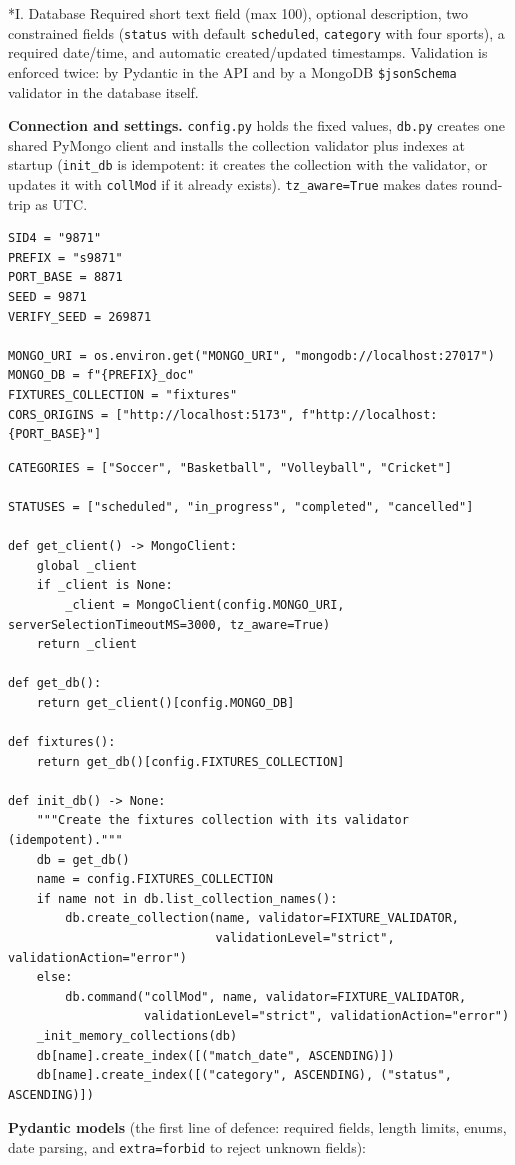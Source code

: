 \documentclass[11pt]{article}
\makeatletter
\renewcommand\subsection{\@startsection{subsection}{2}{\z@}{-2.2ex \@plus -1ex \@minus -.2ex}{0.8ex \@plus.2ex}{\normalfont\fontsize{12}{14.5}\selectfont\bfseries}}
\makeatother
\begin{document}
\subsection*{I. Database}
Required short text field (max 100), optional description, two constrained fields (\verb|status| with default \verb|scheduled|, \verb|category| with four sports), a required date/time, and automatic created/updated timestamps. Validation is enforced twice: by Pydantic in the API and by a MongoDB \verb|$jsonSchema| validator in the database itself.

\textbf{Connection and settings.} \verb|config.py| holds the fixed values, \verb|db.py| creates one shared PyMongo client and installs the collection validator plus indexes at startup (\verb|init_db| is idempotent: it creates the collection with the validator, or updates it with \verb|collMod| if it already exists). \verb|tz_aware=True| makes dates round-trip as UTC.

\begingroup\lstset{basicstyle=\ttfamily\scriptsize}
\begin{lstlisting}
SID4 = "9871"
PREFIX = "s9871"
PORT_BASE = 8871
SEED = 9871
VERIFY_SEED = 269871

MONGO_URI = os.environ.get("MONGO_URI", "mongodb://localhost:27017")
MONGO_DB = f"{PREFIX}_doc"
FIXTURES_COLLECTION = "fixtures"
CORS_ORIGINS = ["http://localhost:5173", f"http://localhost:{PORT_BASE}"]
\end{lstlisting}
\endgroup
\begingroup\lstset{basicstyle=\ttfamily\scriptsize}
\begin{lstlisting}
CATEGORIES = ["Soccer", "Basketball", "Volleyball", "Cricket"]

STATUSES = ["scheduled", "in_progress", "completed", "cancelled"]

def get_client() -> MongoClient:
    global _client
    if _client is None:
        _client = MongoClient(config.MONGO_URI, serverSelectionTimeoutMS=3000, tz_aware=True)
    return _client

def get_db():
    return get_client()[config.MONGO_DB]

def fixtures():
    return get_db()[config.FIXTURES_COLLECTION]

def init_db() -> None:
    """Create the fixtures collection with its validator (idempotent)."""
    db = get_db()
    name = config.FIXTURES_COLLECTION
    if name not in db.list_collection_names():
        db.create_collection(name, validator=FIXTURE_VALIDATOR,
                             validationLevel="strict", validationAction="error")
    else:
        db.command("collMod", name, validator=FIXTURE_VALIDATOR,
                   validationLevel="strict", validationAction="error")
    _init_memory_collections(db)
    db[name].create_index([("match_date", ASCENDING)])
    db[name].create_index([("category", ASCENDING), ("status", ASCENDING)])
\end{lstlisting}
\endgroup
\textbf{Pydantic models} (the first line of defence: required fields, length limits, enums, date parsing, and \verb|extra=forbid| to reject unknown fields):
\end{document}
